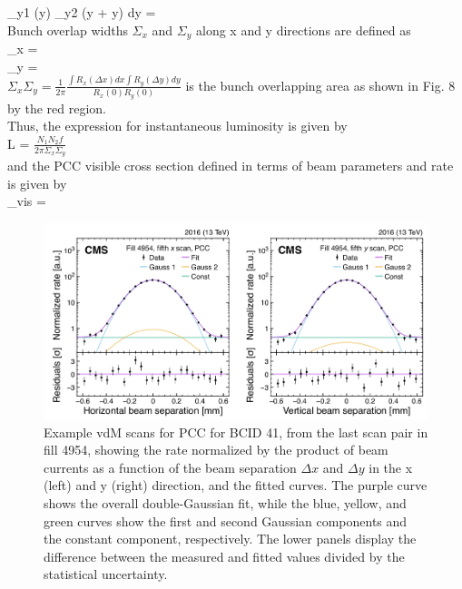 \int \rho_{y1} (y) \rho_{y2} (y + \Delta y) dy =  \\

Bunch overlap widths $\Sigma_x$ and $\Sigma_y$ along x and y directions are defined as \\

\Sigma_x =   \\

\Sigma_y =    \\

$\Sigma_x \Sigma_y = \frac{1}{2 \pi} \frac{\int R_x(\Delta x)dx \int R_y(\Delta y) dy}{R_x(0) R_y(0)}$  is the bunch overlapping area as shown in Fig. 8 by the red region.\\

Thus, the expression for instantaneous luminosity is given by \\

L = $\frac{N_1 N_2 f}{2\pi \Sigma_x \Sigma_y}$ \\

and the PCC visible cross section defined in terms of beam parameters and rate is given by \\

\sigma_{vis} =  \\


\begin{figure}[H]
  \centering
  \includegraphics[width=0.7\columnwidth]{./vdmfit.png}
  \caption{ \onehalfspacing Example vdM scans for PCC for BCID 41, from the last scan pair in fill 4954, showing the rate normalized by the product of beam currents as a function of the beam separation $\Delta x$ and $\Delta y$ in the x (left) and y (right) direction, and the fitted curves. The purple curve shows the overall double-Gaussian fit, while the blue, yellow, and green curves show the first and second Gaussian components and the constant component, respectively. The lower panels display the difference between the measured and fitted values
divided by the statistical uncertainty\cite{}.}
  \label{fig:CMS}
\end{figure}


